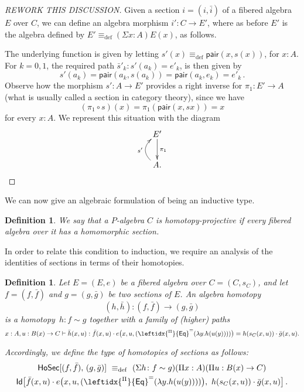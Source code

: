 \documentclass[reqno,10pt,a4paper,oneside]{amsart}
\numberwithin{equation}{section}
\theoremstyle{mythm}
\theoremstyle{mydef}
\newtheorem{definition}[theorem]{Definition}
\theoremstyle{myrmk}
\newcommand{\ie}{\text{i.e.\ }}
\newcommand{\deq}{\equiv}
\newcommand{\defeq}{\deq_{\mathrm{def}}}
\newcommand{\co}{\colon}
\newcommand{\ct}{\cdot}
\newcommand{\funext}{\leftidx{^\Pi}{\mathsf{Eq}}^{=}}
\newcommand{\pair}{\mathsf{pair}}
\newcommand{\Id}{\mathsf{Id}}
\newcommand{\Ho}{\mathsf{Ho}}
\begin{document}
\begin{proof}
[REWORK THIS DISCUSSION]
Given a section $i = (i, \bar{i})$ of a fibered algebra $E$ over $C$, we can define an algebra morphism $i' \co C \to E'$, where as before $E'$ is the algebra defined by $E' \defeq (\Sigma x :A) E(x)$, as follows.

The underlying function is given by letting $s'(x) \defeq \pair(x, s(x))$, for $x : A$. For $k = 0, 1$, the required path $\bar{s}'_k \co s'(a_k) = e'_k$,
is then given by
\[
s'(a_k) = \pair(a_k, s(a_k)) =  \pair(a_k, e_k) = e'_k \, .
\]
Observe how the morphism $s' \co A \to E'$ provides a right inverse for $\pi_1 \co E' \to A$ (\ie what is usually called a section in 
category theory), since we have
\[
(\pi_1 \circ s)(x) = \pi_1 (\pair(x, sx)) = x 
\]
for every $x \co A$. We represent this situation with the diagram
\[
\xymatrix{
E' \ar[d]^{\pi_1} \\
A . \ar@/^1.2pc/[u]^{s'} }
\]
\end{proof}

We can now give an algebraic formulation of being an inductive type.

\begin{definition} We say that a $P$-algebra $C$ is \emph{homotopy-projective} if every fibered algebra over it has a homomorphic section.
\end{definition} 

In order to relate this condition to induction, we require an analysis of the identities of sections in terms of their homotopies.

\begin{definition} \label{def:W2cellsection} Let $E = (E, e)$ be a fibered algebra over $C = (C, s_C)$, and let $f = (f, \bar{f})$ and $g = (g, \bar{g})$ be two sections of $E$.  An \emph{algebra homotopy} 
\[
(h, \bar{h}) \co (f, \bar{f})  \rightarrow (g, \bar{g})
\] 
is a homotopy~$h\co f \sim g$ together with a family of (higher) paths 
\[
x : A, u : B(x) \to C \vdash \bar{h}(x,u) : 
\bar{f}(x,u)  \ct e\big(x,u,(\funext(\lambda{y}.h(u(y))))\big) = 
h(s_C(x,u)) \ct \bar{g}(x,u).
\]

Accordingly, we define the type of homotopies of sections as follows:
\begin{multline*}
\Ho\mathsf{Sec}[ (f, \bar{f}) ,\, (g, \bar{g}) ]\ \defeq\ 
(\Sigma h \co f \sim g) (\Pi x : A)(\Pi u : B(x) \to C)\\
\Id\big[ \bar{f}(x,u)  \ct e\big(x,u,(\funext(\lambda{y}.h(u(y))))\big),\ 
h(s_C(x,u)) \ct \bar{g}(x,u) \big]\, .
\end{multline*}
\end{definition} 
\end{document}
